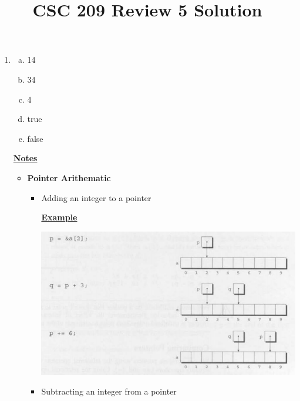 \documentclass[12pt]{article}
\begin{document}
\title{CSC 209 Review 5 Solution}
\maketitle

\bigskip

\begin{enumerate}[1.]
    \item

    \bigskip

    \begin{enumerate}[a)]
        \item 14
        \item 34
        \item 4
        \item true
        \item false
    \end{enumerate}

    \underline{\textbf{Notes}}

    \begin{itemize}
        \item \textbf{Pointer Arithematic}

        \begin{itemize}
            \item Adding an integer to a pointer

            \bigskip

            \underline{\textbf{Example}}

            \begin{center}
            \includegraphics[width=\linewidth]{images/review_5_solution_1.png}
            \end{center}

            \bigskip

            \item Subtracting an integer from a pointer


\end{itemize}
\end{itemize}
\end{enumerate}
\end{document}
